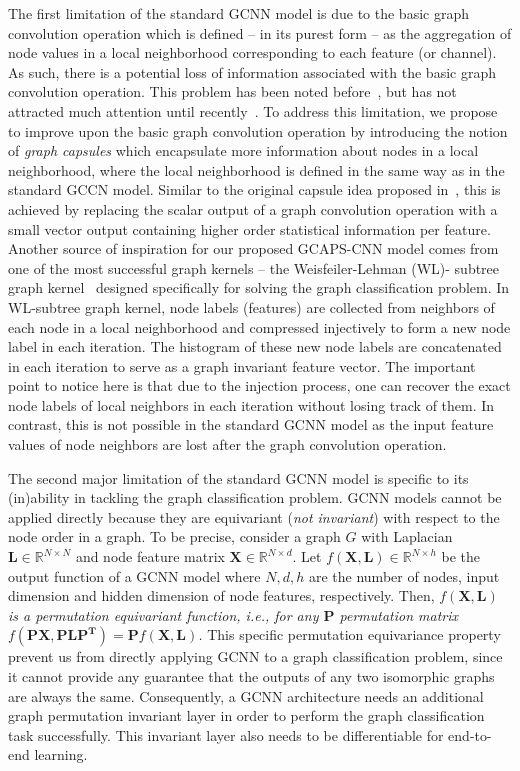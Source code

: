 \documentclass{article}
\begin{document}
 The first limitation of the standard GCNN model  is due to the basic graph convolution operation which is defined -- in its purest form -- as the aggregation of node values in a local neighborhood corresponding to each feature (or channel). As such,  there is a potential loss of information associated with  the basic graph convolution operation.  
This problem has been noted  before~\cite{hinton2011transforming}, but has not attracted much attention  until recently~\cite{sabour2017dynamic}. To address this limitation, we  propose to improve upon the basic graph convolution operation by introducing the notion of {\em graph capsules} which encapsulate more information about nodes in a local neighborhood, where the local neighborhood is defined in the same way as in the standard GCCN model. Similar to the original capsule idea proposed in~\cite{hinton2011transforming}, this is achieved by replacing the scalar output  of a graph convolution operation  with a small vector output containing higher order statistical information per feature. Another source of inspiration for our proposed GCAPS-CNN model comes from one of the most successful graph kernels -- the Weisfeiler-Lehman (WL)- subtree graph kernel~\cite{shervashidze2011weisfeiler} designed specifically for solving the graph classification problem.
 In WL-subtree graph kernel, node labels  (features) are collected from neighbors of each node in a local neighborhood  and  compressed injectively to form a new node label in each iteration. The histogram of these new node labels are concatenated in each iteration to serve  as a  graph invariant feature vector. The important point to notice here  is that  due to the injection process, one can recover  the exact node labels of local neighbors in each iteration without losing  track of them. In contrast, this is not possible in the standard GCNN model as the   input feature values of node neighbors are lost  after the graph convolution operation.

The second major limitation of the standard GCNN model is specific to its (in)ability in tackling the graph classification problem.  GCNN models cannot be applied   directly   because they are equivariant  ({\em not invariant}) with respect to the node order in a graph. To be precise, consider a graph $G$  with Laplacian $\mathbf{L}\in \mathbb{R}^{N \times N}$    and node feature matrix $\mathbf{X}\in \mathbb{R}^{N \times d}$. Let $f(\mathbf{X}, \mathbf{L}) \in \mathbb{R}^{N \times h} $ be the output function of a GCNN model where $N, d, h$ are the number of nodes, input dimension and  hidden dimension of node features, respectively.  Then,
\textit{$f(\mathbf{X}, \mathbf{L})$ is a permutation equivariant function, i.e., for any $\mathbf{P}$   permutation matrix $f(\mathbf{P}\mathbf{X}, \mathbf{PLP^{T}}) = \mathbf{P}f(\mathbf{X}, \mathbf{L})$. }
This specific permutation equivariance property prevent us from directly applying GCNN to a graph classification problem, since it cannot provide any guarantee that the outputs of  any two isomorphic graphs are always the same. Consequently,  a GCNN architecture needs an additional graph permutation invariant layer in order to perform the  graph classification task successfully. This invariant layer  also   needs to be differentiable  for end-to-end learning.
\end{document}
